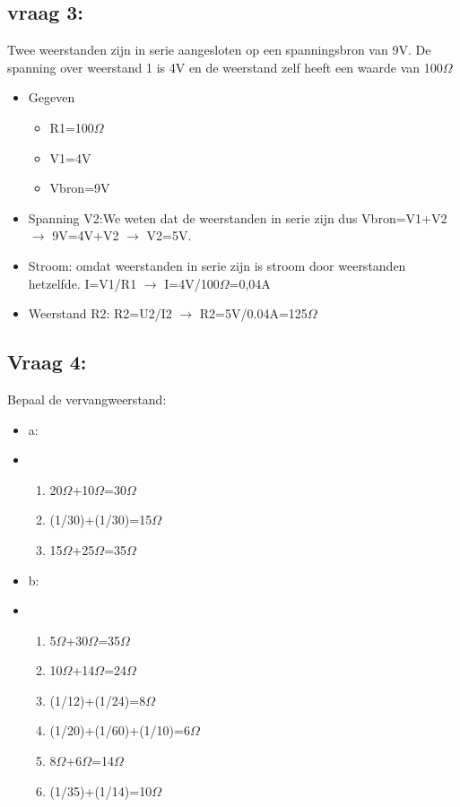 \documentclass[12pt]{article}
\begin{document}
\subsection{vraag 3:}
Twee weerstanden zijn in serie aangesloten op een spanningsbron van 9V. De spanning over weerstand 1 is 4V en de weerstand zelf heeft een waarde van 100$\Omega$
\begin{itemize}
    \item[] Gegeven\begin{itemize}
    \item R1=100$\Omega$
    \item V1=4V
    \item Vbron=9V
    \end{itemize}
\end{itemize}
\begin{itemize}
    \item Spanning V2:We weten dat de weerstanden in serie zijn dus Vbron=V1+V2 $\rightarrow$ 9V=4V+V2 $\rightarrow$ V2=5V.
    \item Stroom: omdat weerstanden in serie zijn is stroom door weerstanden hetzelfde. I=V1/R1 $\rightarrow$ I=4V/100$\Omega$=0,04A
    \item Weerstand R2: R2=U2/I2 $\rightarrow$ R2=5V/0.04A=125$\Omega$
\end{itemize}
\subsection{Vraag 4:}
Bepaal de vervangweerstand:\begin{itemize}
    \item[]a:
    \item[]\begin{enumerate}
        \item 20$\Omega$+10$\Omega$=30$\Omega$
        \item (1/30)+(1/30)=15$\Omega$
        \item 15$\Omega$+25$\Omega$=35$\Omega$
    \end{enumerate}
    \item[]b:
    \item[]\begin{enumerate}
        \item 5$\Omega$+30$\Omega$=35$\Omega$
        \item 10$\Omega$+14$\Omega$=24$\Omega$
        \item (1/12)+(1/24)=8$\Omega$
        \item (1/20)+(1/60)+(1/10)=6$\Omega$
        \item 8$\Omega$+6$\Omega$=14$\Omega$
        \item (1/35)+(1/14)=10$\Omega$
    \end{enumerate}
\end{itemize}
\end{document}

